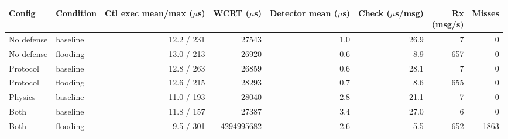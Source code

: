 \begin{tabular}{llrrrrrr}
\toprule
Config & Condition & \makecell{Ctl exec\\mean/max ($\mu$s)} & \makecell{WCRT\\($\mu$s)} & \makecell{Detector\\mean ($\mu$s)} & \makecell{Check\\($\mu$s/msg)} & \makecell{Rx\\(msg/s)} & Misses \\
\midrule
No defense & baseline & 12.2 / 231 & 27543 & 1.0 & 26.9 & 7 & 0 \\
No defense & flooding & 13.0 / 213 & 26920 & 0.6 & 8.9 & 657 & 0 \\
Protocol & baseline & 12.8 / 263 & 26859 & 0.6 & 28.1 & 7 & 0 \\
Protocol & flooding & 12.6 / 215 & 28293 & 0.7 & 8.6 & 655 & 0 \\
Physics & baseline & 11.0 / 193 & 28040 & 2.8 & 21.1 & 7 & 0 \\
Both & baseline & 11.8 / 157 & 27387 & 3.4 & 27.0 & 6 & 0 \\
Both & flooding & 9.5 / 301 & 4294995682 & 2.6 & 5.5 & 652 & 1863 \\
\bottomrule
\end{tabular}
